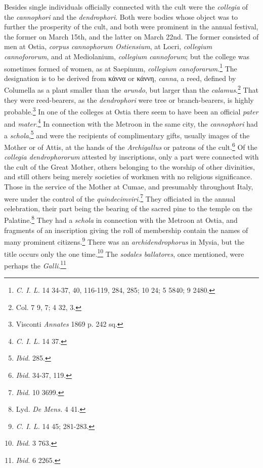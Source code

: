 \documentclass[a4paper, 11pt, oneside, polutonikogreek, english]{article}
\begin{document}
Besides single individuals officially connected with the cult were the \emph{collegia} of the \emph{cannophori} and the \emph{dendrophori}. Both were bodies whose object was to further the prosperity of the cult, and both were prominent in the annual festival, the former on March 15th, and the latter on March 22nd. The former consisted of men at Ostia, \emph{corpus cannophorum Ostiensium}, at Locri, \emph{collegium cannofororum}, and at Mediolanium, \emph{collegium cannoforum}; but the college was sometimes formed of women, as at Saepinum, \emph{collegium canoforarum}.\footnote{\emph{C. I. L.} 14 34-37, 40, 116-119, 284, 285; 10 24; 5 5840; 9 2480.} The designation is to be derived from κάννα or κάννη, \emph{canna}, a reed, defined by Columella as a plant smaller than the \emph{arundo}, but larger than the \emph{calamus}.\footnote{Col. 7 9, 7; 4 32, 3.} That they were reed-bearers, as the \emph{dendrophori} were tree or branch-bearers, is highly probable.\footnote{Visconti \emph{Annates} 1869 p. 242 sq.} In one of the colleges at Ostia there seem to have been an official \emph{pater} and \emph{mater}.\footnote{\emph{C. I. L.} 14 37.} In connection with the Metroon in the same city, the \emph{cannophori} had a \emph{schola},\footnote{\emph{Ibid.} 285.} and were the recipients of complimentary gifts, usually images of the Mother or of Attis, at the hands of the \emph{Archigallus} or patrons of the cult.\footnote{\emph{Ibid.} 34-37, 119.} Of the \emph{collegia dendrophororum} attested by inscriptions, only a part were connected with the cult of the Great Mother, others belonging to the worship of other divinities, and still others being merely societies of workmen with no religious significance. Those in the service of the Mother at Cumae, and presumably throughout Italy, were under the control of the \emph{quindecimviri}.\footnote{\emph{Ibid.} 10 3699.} They officiated in the annual celebration, their part being the bearing of the sacred pine to the temple on the Palatine.\footnote{Lyd. \emph{De Mens.} 4 41.} They had a \emph{schola} in connection with the Metroon at Ostia, and fragments of an inscription giving the roll of membership contain the names of many prominent citizens.\footnote{\emph{C. I. L.} 14 45; 281-283.} There was an \emph{archidendrophorus} in Mysia, but the title occurs only the one time.\footnote{\emph{Ibid.} 3 763.} The \emph{sodales ballatores}, once mentioned, were perhaps the \emph{Galli}.\footnote{\emph{Ibid.} 6 2265.}
\end{document}
